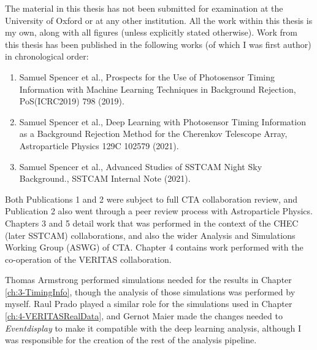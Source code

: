 The material in this thesis has not been submitted for examination at the University of Oxford or at any other institution. All the work within this thesis is my own, along with all figures (unless explicitly stated otherwise). Work from this thesis has been published in the following works (of which I was first author) in chronological order:

\begin{centering}
\begin{enumerate}
    \item Samuel Spencer et al., Prospects for the Use of Photosensor Timing Information with Machine Learning Techniques in Background Rejection, PoS(ICRC2019) 798 (2019).
    \item Samuel Spencer et al., Deep Learning with Photosensor Timing Information as a Background Rejection Method for the Cherenkov Telescope Array, Astroparticle Physics 129C 102579 (2021).
    \item Samuel Spencer et al., Advanced Studies of SSTCAM Night Sky Background., SSTCAM Internal Note (2021). 
\end{enumerate}
\end{centering}
Both Publications 1 and 2 were subject to full CTA collaboration review, and Publication 2 also went through a peer review process with Astroparticle Physics. Chapters 3 and 5 detail work that was performed in the context of the CHEC (later SSTCAM) collaborations, and also the wider Analysis and Simulations Working Group (ASWG) of CTA. Chapter 4 contains work performed with the co-operation of the VERITAS collaboration.

Thomas Armstrong performed simulations needed for the results in Chapter \ref{ch:3-TimingInfo}, though the analysis of those simulations was performed by myself. Raul Prado played a similar role for the simulations used in Chapter \ref{ch:4-VERITASRealData}, and Gernot Maier made the changes needed to \textit{Eventdisplay} to make it compatible with the deep learning analysis, although I was responsible for the creation of the rest of the analysis pipeline.